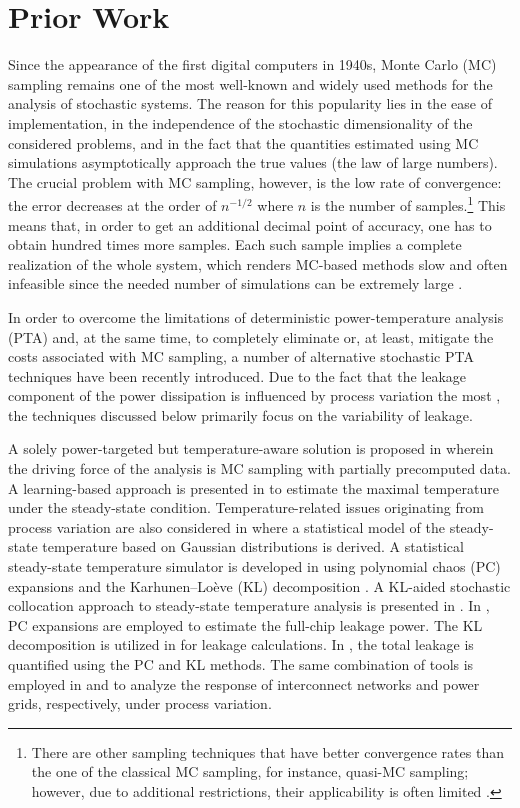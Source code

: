 \section{Prior Work}

Since the appearance of the first digital computers in 1940s, Monte Carlo (MC)
sampling remains one of the most well-known and widely used methods for the
analysis of stochastic systems. The reason for this popularity lies in the ease
of implementation, in the independence of the stochastic dimensionality of the
considered problems, and in the fact that the quantities estimated using MC
simulations asymptotically approach the true values (the law of large numbers).
The crucial problem with MC sampling, however, is the low rate of convergence:
the error decreases at the order of $n^{-1/2}$ where $n$ is the number of
samples.\footnote{There are other sampling techniques that have better
convergence rates than the one of the classical MC sampling, for instance,
quasi-MC sampling; however, due to additional restrictions, their applicability
is often limited \cite{xiu2010}.} This means that, in order to get an additional
decimal point of accuracy, one has to obtain hundred times more samples. Each
such sample implies a complete realization of the whole system, which renders
MC-based methods slow and often infeasible since the needed number of
simulations can be extremely large \cite{diaz-emparanza2002}.

In order to overcome the limitations of deterministic power-temperature analysis
(PTA) and, at the same time, to completely eliminate or, at least, mitigate the
costs associated with MC sampling, a number of alternative stochastic PTA
techniques have been recently introduced. Due to the fact that the leakage
component of the power dissipation is influenced by process variation the most
\cite{chandrakasan2001, srivastava2010, juan2011, juan2012}, the techniques
discussed below primarily focus on the variability of leakage.

A solely power-targeted but temperature-aware solution is proposed in
\cite{chandra2010} wherein the driving force of the analysis is MC sampling with
partially precomputed data. A learning-based approach is presented in
\cite{juan2011} to estimate the maximal temperature under the steady-state
condition. Temperature-related issues originating from process variation are
also considered in \cite{juan2012} where a statistical model of the steady-state
temperature based on Gaussian distributions is derived. A statistical
steady-state temperature simulator is developed in \cite{huang2009a} using
polynomial chaos (PC) expansions and the Karhunen--Lo\`{e}ve (KL) decomposition
\cite{xiu2010, ghanem1991}. A KL-aided stochastic collocation \cite{xiu2010}
approach to steady-state temperature analysis is presented in \cite{lee2013}. In
\cite{shen2009}, PC expansions are employed to estimate the full-chip leakage
power. The KL decomposition is utilized in \cite{bhardwaj2006} for leakage
calculations. In \cite{bhardwaj2008}, the total leakage is quantified using the
PC and KL methods. The same combination of tools is employed in
\cite{vrudhula2006} and \cite{ghanta2006} to analyze the response of
interconnect networks and power grids, respectively, under process variation.

